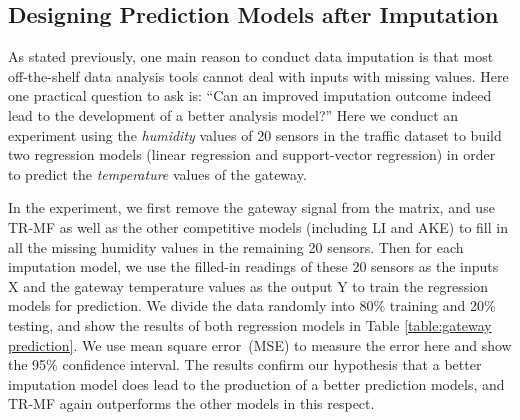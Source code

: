 

\subsection{Designing Prediction Models after Imputation}\label{subsec:furtherPredict}
As stated previously, one main reason to conduct data imputation is that most off-the-shelf data analysis tools cannot deal with inputs with missing values.
Here one practical question to ask is: ``Can an improved imputation outcome indeed lead to the development of a better analysis model?''
Here we conduct an experiment using the {\em humidity} values of 20 sensors in the traffic dataset to build two regression models (linear regression and support-vector regression) in order
to predict the {\em temperature} values of the gateway.

In the experiment, we first remove the gateway signal from the matrix, and use TR-MF as well as the other competitive models (including LI and AKE) to fill in all the missing humidity values in the remaining 20 sensors.
Then for each imputation model, we use the filled-in readings of these 20 sensors as the inputs X and the gateway temperature values as the output Y to train the regression models for prediction.
We divide the data randomly into 80\% training and 20\% testing, and show the results of both regression models in Table \ref{table:gateway prediction}.
We use mean square error~(MSE) to measure the error here and show the 95\% confidence interval.
The results confirm our hypothesis that a better imputation model does lead to the production of a better prediction models, and TR-MF again outperforms the other models in this respect.

